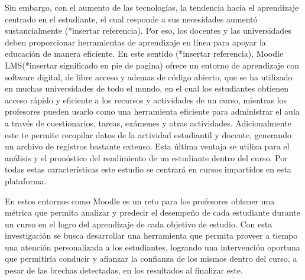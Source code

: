 Sin embargo, con el aumento de las tecnologías, la tendencia hacia el aprendizaje centrado en el estudiante, 
el cual responde a sus necesidades aumentó sustancialmente (*insertar referencia). Por eso, los docentes y 
las universidades deben proporcionar herramientas de aprendizaje en línea para apoyar la educación 
de manera eficiente. En este sentido (*insertar referencia), Moodle LMS(*insertar significado en pie de pagina) 
ofrece un entorno de aprendizaje con software digital, de libre acceso y ademas de código abierto, que se ha utilizado en muchas universidades de todo 
el mundo, en el cual los estudiantes obtienen acceso rápido y eficiente a los recursos y actividades 
de un curso, mientras los profesores pueden usarlo como una herramienta eficiente para administrar el 
aula a través de cuestionarios, tareas, exámenes y otras actividades. Adicionalmente este te permite recopilar datos 
de la actividad estudiantil y docente, generando un archivo de registros bastante extenso. Esta última ventaja 
se utiliza para el análisis y el pronóstico del rendimiento de un estudiante dentro del curso. Por todas estas 
características este estudio se centrará en cursos impartidos en esta plataforma.

En estos entornos como Moodle es un reto para los profesores obtener una métrica que permita analizar 
y predecir el desempeño de cada estudiante durante un curso en el logro del aprendizaje de cada objetivo 
de estudio. Con esta investigación se busca desarrollar una herramienta que permita proveer a tiempo una 
atención personalizada a los estudiantes, logrando una intervención oportuna que permitiría conducir y 
afianzar la confianza de los mismos dentro del curso, a pesar de las brechas detectadas, en los resultados al 
finalizar este.

